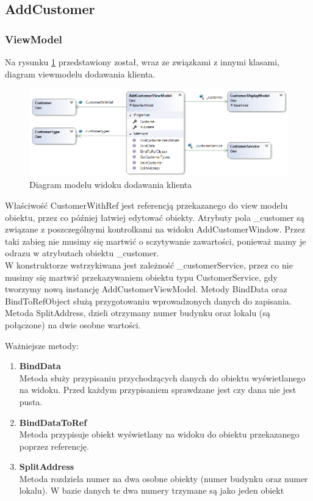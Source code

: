 \subsection{AddCustomer}

\subsubsection{ViewModel}
Na rysunku \ref{fig:addCustomerViewModelDiagram} przedstawiony został, wraz ze związkami z innymi klasami, diagram viewmodelu dodawania klienta. 

\begin{figure}[ht!]
  \includegraphics[width=\linewidth]{Rysunki/AddCustomerViewModelDiagram.png}
  \caption{Diagram modelu widoku dodawania klienta}
  \label{fig:addCustomerViewModelDiagram}
\end{figure}

Właściwość CustomerWithRef jest referencją przekazanego do view modelu obiektu, przez co później łatwiej edytować obiekty.
Atrybuty pola \_customer są związane z poszczególnymi kontrolkami na widoku AddCustomerWindow. Przez taki zabieg nie musimy się martwić o sczytywanie zawartości, ponieważ mamy je odrazu w atrybutach obiektu \_customer. 
\\
W konstruktorze wstrzykiwana jest zależność \_customerService, przez co nie musimy się martwić przekazywaniem obiektu typu CustomerService, gdy tworzymy nową instancję AddCustomerViewModel. Metody BindData oraz BindToRefObject służą przygotowaniu wprowadzonych danych do zapisania. Metoda SplitAddress, dzieli otrzymany numer budynku oraz lokalu (są połączone) na dwie osobne wartości. 

Ważniejsze metody:

\begin{enumerate}
    \item \textbf{BindData} \\
    Metoda służy przypisaniu przychodzących danych do obiektu wyświetlanego na widoku. Przed każdym przypisaniem sprawdzane jest czy dana nie jest pusta. 
    \\
    \item \textbf{BindDataToRef} \\
    Metoda przypisuje obiekt wyświetlany na widoku do obiektu przekazanego poprzez referencję. 
    \\
    \item \textbf{SplitAddress} \\
    Metoda rozdziela numer na dwa osobne obiekty (numer budynku oraz numer lokalu). W bazie danych te dwa numery trzymane są jako jeden obiekt
\end{enumerate}

